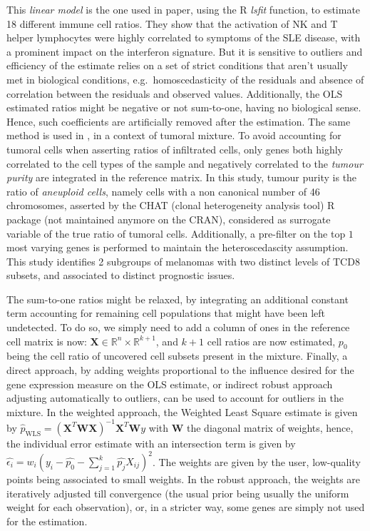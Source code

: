 This \emph{linear model} is the one used in
\autocite{abbas_etal09}
paper, using the R \emph{lsfit} function, to estimate 18 different
immune cell ratios. They show that the activation of NK and T helper
lymphocytes were highly correlated to symptoms of the SLE disease, with
a prominent impact on the interferon signature. But it is sensitive to
outliers and efficiency of the estimate relies on a set of strict
conditions that aren't usually met in biological conditions,
e.g.~homoscedasticity of the residuals and absence of correlation
between the residuals and observed values. Additionally, the OLS
estimated ratios might be negative or not sum-to-one, having no
biological sense. Hence, such coefficients are artificially removed
after the estimation. The same method is used in
\autocite{li_etal16}, in a context of
tumoral mixture. To avoid accounting for tumoral cells when asserting
ratios of infiltrated cells, only genes both highly correlated to the
cell types of the sample and negatively correlated to the \emph{tumour
purity} are integrated in the reference matrix. In this study, tumour
purity is the ratio of \emph{aneuploid cells}, namely cells with a non
canonical number of 46 chromosomes, asserted by the CHAT (clonal
heterogeneity analysis tool) R package (not maintained anymore on the
CRAN), considered as surrogate variable of the true ratio of tumoral
cells. Additionally, a pre-filter on the top \(1%
\) most varying genes is performed to maintain the heteroscedascity
assumption. This study identifies 2 subgroups of melanomas with two
distinct levels of TCD8 subsets, and associated to distinct prognostic
issues.

The sum-to-one ratios might be relaxed, by integrating an additional
constant term accounting for remaining cell populations that might have
been left undetected. To do so, we simply need to add a column of ones
in the reference cell matrix is now:
\(\boldsymbol{X} \in \mathbb{R}^{n} \times \mathbb{R}^{k + 1}\), and
\(k + 1\) cell ratios are now estimated, \(p_0\) being the cell ratio of
uncovered cell subsets present in the mixture. Finally, a direct
approach, by adding weights proportional to the influence desired for
the gene expression measure on the OLS estimate, or indirect robust
approach adjusting automatically to outliers, can be used to account for
outliers in the mixture. In the weighted approach, the Weighted Least
Square estimate is given by
\(\hat{p}_{\text{WLS}} = (\boldsymbol{X}^T\mathbf{W}\boldsymbol{X})^{-1}\boldsymbol{X}^T\mathbf{W}y\)
with \(\mathbf{W}\) the diagonal matrix of weights, hence, the
individual error estimate with an intersection term is given by
\(\hat{\epsilon_i}=w_i\left( y_i - \hat{p_0} - \sum_{j=1}^k \hat{p_j} X_{ij}\right)^2\).
The weights are given by the user, low-quality points being associated
to small weights. In the robust approach, the weights are iteratively
adjusted till convergence (the usual prior being usually the uniform
weight for each observation), or, in a stricter way, some genes are
simply not used for the estimation.

